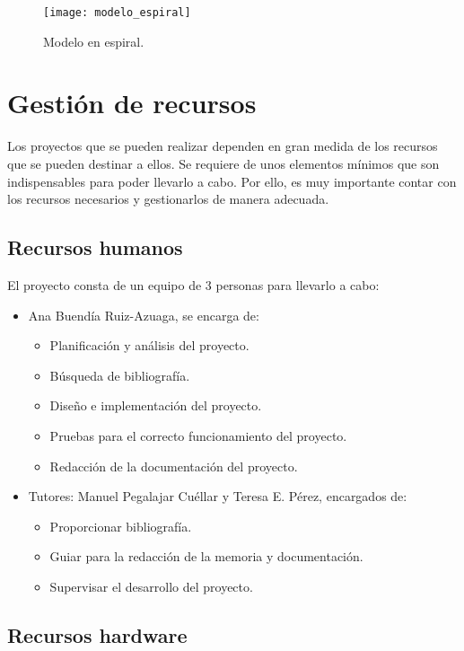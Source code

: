 \begin{figure}
\begin{center}
\caption{Modelo en espiral.}
\label{modelo_espiral}
\texttt{[image: modelo\_espiral]}
\end{center}
\end{figure}

\section{Gestión de recursos}

Los proyectos que se pueden realizar dependen en gran medida de los recursos que se pueden destinar a ellos. Se requiere de unos elementos mínimos que son indispensables para poder llevarlo a cabo. Por ello, es muy importante contar con los recursos necesarios y gestionarlos de manera adecuada.

\subsection{Recursos humanos}

El proyecto consta de un equipo de 3 personas para llevarlo a cabo:

\begin{itemize}
\item Ana Buendía Ruiz-Azuaga, se encarga de:
	\begin{itemize}
	\item Planificación y análisis del proyecto.
	\item Búsqueda de bibliografía.
	\item Diseño e implementación del proyecto.
	\item Pruebas para el correcto funcionamiento del proyecto.
	\item Redacción de la documentación del proyecto.
	\end{itemize}
\item Tutores: Manuel Pegalajar Cuéllar y Teresa E. Pérez, encargados de:
	\begin{itemize}
	\item Proporcionar bibliografía.
	\item Guiar para la redacción de la memoria y documentación.
	\item Supervisar el desarrollo del proyecto.
	\end{itemize}
\end{itemize}

\subsection{Recursos hardware}

